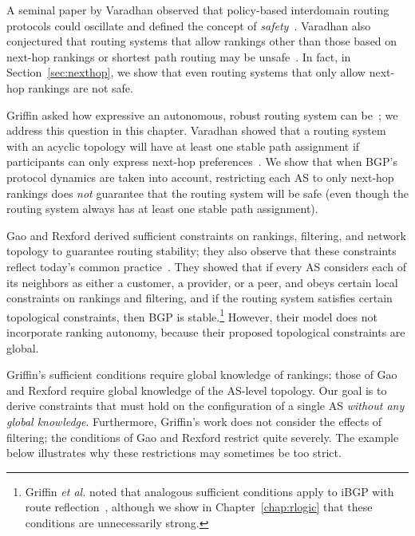 A seminal paper by Varadhan \ea observed that policy-based interdomain
routing protocols could oscillate and defined the concept of {\em
safety}~\cite{Varadhan1996,Varadhan2000}.  Varadhan
\ea also conjectured that routing systems that allow rankings other than
those based on next-hop rankings or shortest path routing may be
unsafe~\cite{Varadhan1996,Varadhan2000}.  In fact, in
Section~\ref{sec:nexthop}, we show that even routing systems that only
allow next-hop rankings are not safe.


Griffin \ea asked how expressive an autonomous, robust routing system
can be~\cite{Griffin2003}; we address this
question in this chapter.  Varadhan
\ea showed that a routing system with an acyclic topology will have at
least one stable path assignment if participants can only express
next-hop preferences~\cite{Varadhan1996,Varadhan2000}.  We show
that when BGP's protocol dynamics are taken into account, restricting
each AS to only next-hop rankings does {\em not} guarantee that the
routing system will be safe (even though the routing system always has
at least one stable path assignment).


Gao and Rexford derived sufficient constraints on rankings, filtering,
and network topology
to guarantee routing stability; they also observe that these
constraints reflect today's common practice~\cite{Gao2001b,Gao2001a}.
They showed that if every AS considers each of its neighbors as either a
customer, a provider, or a peer, and obeys certain local constraints on
rankings and filtering, and if the routing system satisfies certain
topological constraints, then BGP is stable.\footnote{Griffin {\em et al.}
noted that analogous sufficient conditions apply to iBGP with route
reflection~\cite{Griffin2002}, although we show in
Chapter~\ref{chap:rlogic} that these conditions are unnecessarily
strong.}  However, their model does not incorporate ranking
autonomy, because their proposed topological constraints are global.

Griffin's sufficient conditions require global knowledge of rankings;
those of Gao and Rexford require global knowledge of the AS-level
topology. Our goal is to derive constraints that must hold on the
configuration of a single AS {\em without any global knowledge}.
%
Furthermore, Griffin's work does not consider the effects of filtering;
the conditions of Gao and Rexford restrict quite severely. The example below
illustrates why these restrictions may sometimes be too strict.  


